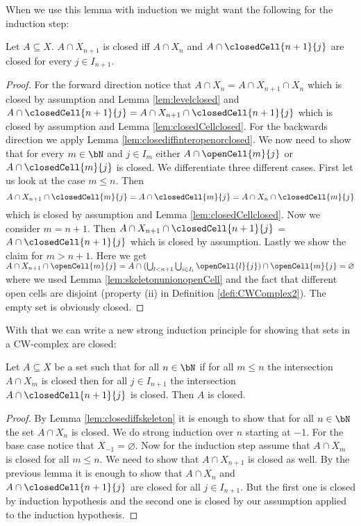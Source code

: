 When we use this lemma with induction we might want the following for the induction step:

\begin{lem}
    Let $A \subseteq X$. $A \cap X_{n + 1}$ is closed iff $A \cap X_n$ and $A \cap \closedCell{n + 1}{j}$ are closed for every $j \in I_{n + 1}$.
\end{lem}
\begin{proof}
    For the forward direction notice that $A \cap X_n = A \cap X_{n + 1} \cap X_n$ which is closed by assumption and Lemma \ref{lem:levelclosed} and $A \cap \closedCell{n + 1}{j} = A \cap X_{n + 1} \cap \closedCell{n + 1}{j}$ which is closed by assumption and Lemma \ref{lem:closedCellclosed}.
    For the backwards direction we apply Lemma \ref{lem:closediffinteropenorclosed}. 
    We now need to show that for every $m \in \bN$ and $j \in I_m$ either $A \cap \openCell{m}{j}$ or $A \cap \closedCell{m}{j}$ is closed. 
    We differentiate three different cases. 
    First let us look at the case $m \le n$.
    Then 
    \[A \cap X_{n + 1} \cap \closedCell{m}{j} = A \cap \closedCell{m}{j} = A \cap X_n \cap \closedCell{m}{j}\]
    which is closed by assumption and Lemma \ref{lem:closedCellclosed}. 
    Now we consider $m = n + 1$. 
    Then $A \cap X_{n + 1} \cap \closedCell{n + 1}{j}$ = $A \cap \closedCell{n + 1}{j}$ which is closed by assumption. 
    Lastly we show the claim for $m > n + 1$. 
    Here we get $A \cap X_{n + 1} \cap \openCell{m}{j} = A \cap (\bigcup_{l < n + 1}\bigcup_{i \in I_l}\openCell{l}{j} ) \cap \openCell{m}{j} = \varnothing$ where we used Lemma \ref{lem:skeletonunionopenCell} and the fact that different open cells are disjoint (property (ii) in Definition \ref{defi:CWComplex2}). 
    The empty set is obviously closed.
\end{proof}

With that we can write a new strong induction principle for showing that sets in a CW-complex are closed: 

\begin{lem}\label{lem:inductionlevel}
    Let $A \subseteq X$ be a set such that for all $n \in \bN$ if for all $m \le n$ the intersection $A \cap X_m$ is closed then for all $j \in I_{n + 1}$ the intersection $A \cap \closedCell{n + 1}{j}$ is closed. 
    Then $A$ is closed.
\end{lem}
\begin{proof}
    By Lemma \ref{lem:closediffskeleton} it is enough to show that for all $n \in \bN$ the set $A \cap X_n$ is closed. 
    We do strong induction over $n$ starting at $-1$. 
    For the base case notice that $X_{-1} = \varnothing$.
    Now for the induction step assume that $A \cap X_m$ is closed for all $m \le n$. 
    We need to show that $A \cap X_{n + 1}$ is closed as well. 
    By the previous lemma it is enough to show that $A \cap X_n$ and $A \cap \closedCell{n + 1}{j}$ are closed for all $j \in I_{n + 1}$. 
    But the first one is closed by induction hypothesis and the second one is closed by our assumption applied to the induction hypothesis.
\end{proof}

